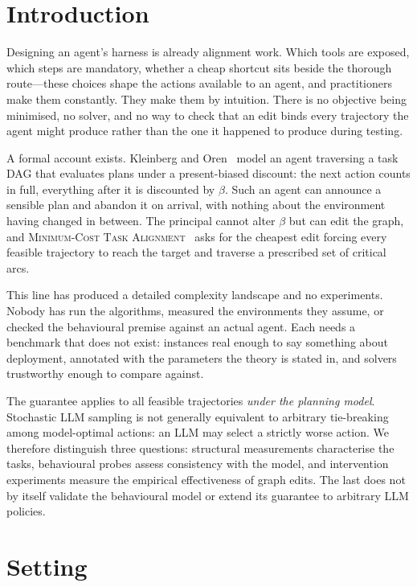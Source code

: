 \documentclass{article}
\newcommand{\MCTA}{\textsc{Minimum-Cost Task Alignment}}
\begin{document}
\section{Introduction}

Designing an agent's harness is already alignment work. Which tools are exposed,
which steps are mandatory, whether a cheap shortcut sits beside the thorough
route---these choices shape the actions available to an agent, and
practitioners make them constantly. They make them by intuition. There is no
objective being minimised, no solver, and no way to check that an edit binds every
trajectory the agent might produce rather than the one it happened to produce
during testing.

A formal account exists. Kleinberg and Oren~\cite{kleinberg2014} model an agent
traversing a task DAG that evaluates plans under a present-biased discount: the
next action counts in full, everything after it is discounted by $\beta$. Such an
agent can announce a sensible plan and abandon it on arrival, with nothing about
the environment having changed in between. The principal cannot alter $\beta$ but
can edit the graph, and \MCTA{}~\cite{belova2024,belova2026} asks for the cheapest
edit forcing every feasible trajectory to reach the target and traverse a
prescribed set of critical arcs.

This line has produced a detailed complexity landscape and no experiments. Nobody
has run the algorithms, measured the environments they assume, or checked the
behavioural premise against an actual agent. Each needs a benchmark that does not
exist: instances real enough to say something about deployment, annotated with the
parameters the theory is stated in, and solvers trustworthy enough to compare
against.

The guarantee applies to all feasible trajectories \emph{under the planning
model}. Stochastic LLM sampling is not generally equivalent to arbitrary
tie-breaking among model-optimal actions: an LLM may select a strictly worse action.
We therefore distinguish three questions: structural measurements characterise the
tasks, behavioural probes assess consistency with the model, and intervention
experiments measure the empirical effectiveness of graph edits. The last does not
by itself validate the behavioural model or extend its guarantee to arbitrary LLM
policies.

\section{Setting}
\end{document}
